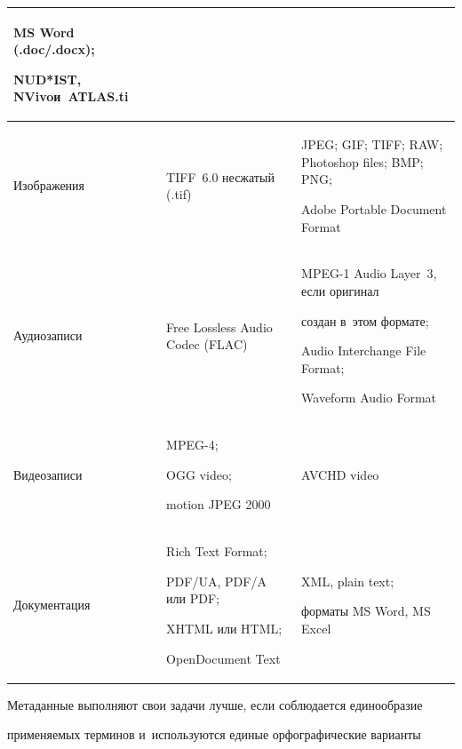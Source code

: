\begin{table}
\begin{center}
\begin{tabular}{|p{30mm}|p{40mm}|p{45mm}|}
MS Word (.doc\!/\!.docx);\newline

NUD*IST, NVivo\newline и~\mbox{ATLAS}.ti\\

\hline

Изображения&TIFF~6.0 несжатый (.tif)&JPEG; GIF; TIFF; RAW; Photoshop files; BMP; PNG; 

Adobe Portable Document Format\\

\hline

Аудиозаписи&Free Lossless Audio Codec (FLAC)&MPEG-1 Audio Layer~3, если оригинал 

создан в~этом формате;\newline

Audio Interchange File Format;\newline

Waveform Audio Format\\

\hline

Видеозаписи&MPEG-4;\newline

OGG video;\newline

motion JPEG 2000&AVCHD video\\

\hline

Документация&Rich Text Format;\newline

PDF\!/\!UA, PDF\!/\!A или PDF;\newline

XHTML или HTML;\newline

OpenDocument Text&XML, plain text;\newline

форматы MS Word, MS Excel\\

\hline

\end{tabular}

\end{center}

\end{table}

  

  Метаданные выполняют свои задачи лучше, если соблюдается единообразие 

применяемых терминов и~используются единые орфографические варианты 

